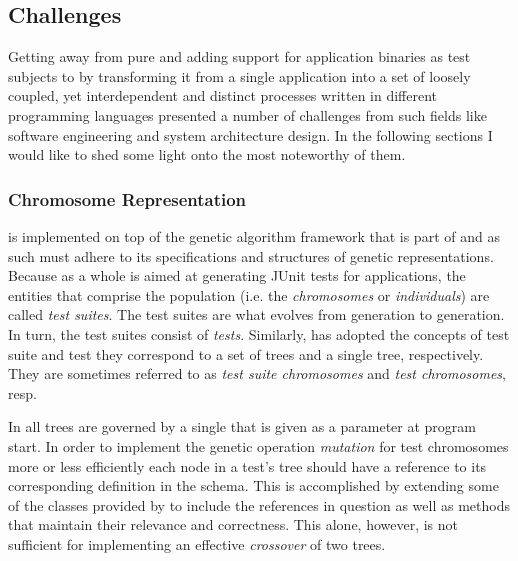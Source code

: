 \subsection{Challenges}
Getting away from pure \java and adding support for application binaries as test subjects 
to \xmlmate by transforming it from 
a single \java application into a set of loosely coupled, yet interdependent and distinct 
processes written in different programming languages presented a number of challenges from 
such fields like software engineering and system architecture design. 
In the following sections I would like to shed some light onto 
the most noteworthy of them.
\subsubsection{Chromosome Representation}
\label{sec:repr}
\xmlmate is implemented on top of the genetic algorithm framework that is part of 
\evosuite\cite{6004309} and as such must adhere to its specifications and structures 
of genetic representations. 
Because \evosuite as a whole is aimed at generating {\small JUnit} tests for \java applications, 
the entities that comprise the population  (i.e. the \emph{chromosomes} or \emph{individuals}) 
are called \emph{test suites}. The test suites are what evolves from generation to generation.
In turn, the test suites consist of \emph{tests}. Similarly, \xmlmate has adopted the concepts of 
test suite and test they correspond to a set of \xml trees and a single \xml tree, respectively. 
They are sometimes referred to as \emph{test suite chromosomes} and \emph{test chromosomes}, resp.


In \xmlmate all \xml trees are governed by a single \xsd that is given as a parameter at program start.
In order to implement the genetic operation \emph{mutation} for test chromosomes more or less 
efficiently each node in a test's \xml tree should have a reference to its corresponding definition 
in the schema. This is accomplished by extending some of the \java classes provided by \xom to include the 
references in question as well as methods that maintain their relevance and correctness. This alone, 
however, is not sufficient for implementing an effective \emph{crossover} of two \xml trees.

